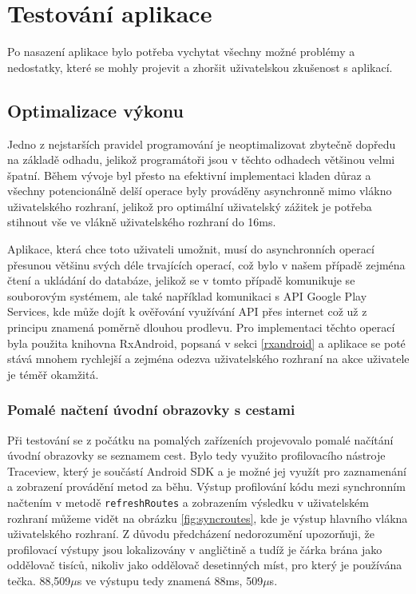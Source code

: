 \documentclass[czech,master,public,dept460,male,java,cpdeclaration]{diploma}
\begin{document}
\section{Testování aplikace}
Po nasazení aplikace bylo potřeba vychytat všechny možné problémy a nedostatky, které se mohly projevit
a zhoršit uživatelskou zkušenost s aplikací.

\subsection{Optimalizace výkonu}
Jedno z nejstarších pravidel programování je neoptimalizovat zbytečně dopředu na základě odhadu,
jelikož programátoři jsou v těchto odhadech většinou velmi špatní. Během vývoje byl přesto na efektivní
implementaci kladen důraz a všechny potencionálně delší operace byly prováděny asynchronně mimo vlákno
uživatelského rozhraní, jelikož pro optimální uživatelský zážitek je potřeba stihnout vše ve vlákně
uživatelského rozhraní do 16ms\cite{perf}.

Aplikace, která chce toto uživateli umožnit, musí do asynchronních operací přesunou většinu svých déle
trvajících operací, což bylo v našem případě zejména čtení a ukládání do databáze, jelikož se v tomto
 případě komunikuje se souborovým systémem, ale také například komunikaci s API Google Play Services,
 kde může dojít k ověřování využívání API přes internet což už z principu znamená poměrně dlouhou
 prodlevu. Pro implementaci těchto operací byla použita knihovna RxAndroid, popsaná v sekci \ref{rxandroid}
 a aplikace se poté stává mnohem rychlejší a zejména odezva uživatelského rozhraní
 na akce uživatele je téměř okamžitá.

\subsubsection{Pomalé načtení úvodní obrazovky s cestami}
 Při testování se z počátku na pomalých zařízeních projevovalo pomalé načítání úvodní obrazovky se
 seznamem cest. Bylo tedy využito profilovacího nástroje Traceview, který je součástí Android SDK
  a je možné jej využít pro zaznamenání a zobrazení provádění metod za běhu. Výstup profilování kódu
  mezi synchronním načtením v metodě \texttt{refreshRoutes} a zobrazením výsledku v uživatelském rozhraní
  můžeme vidět na obrázku \ref{fig:syncroutes}, kde je výstup hlavního vlákna uživatelského rozhraní.
  Z důvodu předcházení nedorozumění upozorňuji, že profilovací výstupy jsou lokalizovány
  v angličtině a tudíž je čárka brána jako oddělovač tisíců, nikoliv jako oddělovač desetinných míst,
  pro který je používána tečka. 88,509$\mu$s ve výstupu tedy znamená 88ms, 509$\mu$s.
\end{document}

